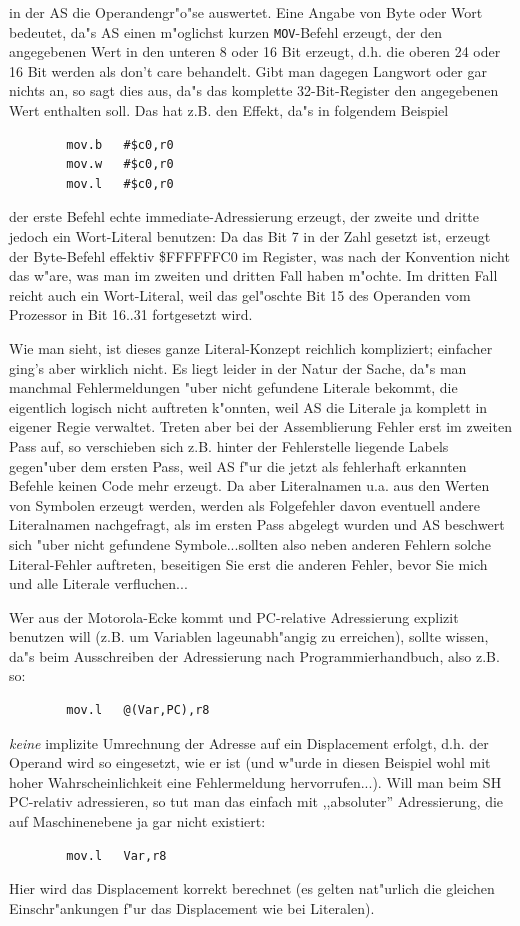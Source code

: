 \documentclass[12pt,a4paper,twoside]{report}
\newcommand{\tty}[1]{{\tt #1}}
\newcommand{\asname}{AS}
\begin{document}
in der \asname{} die Operandengr"o"se auswertet.  Eine Angabe von Byte oder
Wort bedeutet, da"s \asname{} einen m"oglichst kurzen \tty{MOV}-Befehl erzeugt,
der den angegebenen Wert in den unteren 8 oder 16 Bit erzeugt, d.h.
die oberen 24 oder 16 Bit werden als don't care behandelt.  Gibt
man dagegen Langwort oder gar nichts an, so sagt dies aus, da"s
das komplette 32-Bit-Register den angegebenen Wert enthalten soll.
Das hat z.B. den Effekt, da"s in folgendem Beispiel
\begin{verbatim}
        mov.b   #$c0,r0
        mov.w   #$c0,r0
        mov.l   #$c0,r0
\end{verbatim}
der erste Befehl echte immediate-Adressierung erzeugt, der zweite und
dritte jedoch ein Wort-Literal benutzen: Da das Bit 7 in der Zahl gesetzt
ist, erzeugt der Byte-Befehl effektiv \$FFFFFFC0 im Register, was nach
der Konvention nicht das w"are, was man im zweiten und dritten Fall haben
m"ochte.  Im dritten Fall reicht auch ein Wort-Literal, weil das gel"oschte
Bit 15 des Operanden vom Prozessor in Bit 16..31 fortgesetzt wird.
\par
Wie man sieht, ist dieses ganze Literal-Konzept reichlich kompliziert;
einfacher ging's aber wirklich nicht.  Es liegt leider in der Natur
der Sache, da"s man manchmal Fehlermeldungen "uber nicht gefundene
Literale bekommt, die eigentlich logisch nicht auftreten k"onnten, weil
\asname{} die Literale ja komplett in eigener Regie verwaltet.  Treten aber bei
der Assemblierung Fehler erst im zweiten Pass auf, so verschieben sich
z.B. hinter der Fehlerstelle liegende Labels gegen"uber dem ersten Pass,
weil \asname{} f"ur die jetzt als fehlerhaft erkannten Befehle keinen Code mehr
erzeugt.  Da aber Literalnamen u.a. aus den Werten von Symbolen erzeugt
werden, werden als Folgefehler davon eventuell andere Literalnamen
nachgefragt, als im ersten Pass abgelegt wurden und \asname{} beschwert sich
"uber nicht gefundene Symbole...sollten also neben anderen Fehlern solche
Literal-Fehler auftreten, beseitigen Sie erst die anderen Fehler, bevor
Sie mich und alle Literale verfluchen...
\par
Wer aus der Motorola-Ecke kommt und PC-relative Adressierung explizit
benutzen will (z.B. um Variablen lageunabh"angig zu erreichen), sollte
wissen, da"s beim Ausschreiben der Adressierung nach Programmierhandbuch,
also z.B. so:
\begin{verbatim}
        mov.l   @(Var,PC),r8
\end{verbatim}
{\it keine} implizite Umrechnung der Adresse auf ein Displacement erfolgt,
d.h. der Operand wird so eingesetzt, wie er ist (und w"urde in diesen
Beispiel wohl mit hoher Wahrscheinlichkeit eine Fehlermeldung
hervorrufen...).  Will man beim SH PC-relativ adressieren, so tut man
das einfach mit ,,absoluter'' Adressierung, die auf Maschinenebene ja
gar nicht existiert:
\begin{verbatim}
        mov.l   Var,r8
\end{verbatim}
Hier wird das Displacement korrekt berechnet (es gelten nat"urlich die
gleichen Einschr"ankungen f"ur das Displacement wie bei Literalen).
\end{document}
